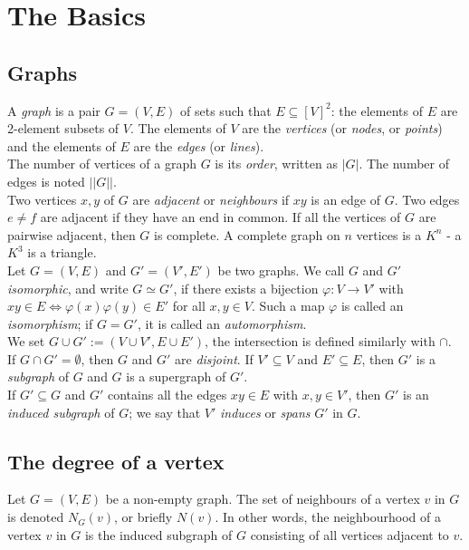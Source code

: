 
\chapter{The Basics}
	\section{Graphs}
		A \textit{graph} is a pair $G = (V, E)$ of sets such that $E \subseteq [V]^2$: the elements of $E$ are 2-element subsets of $V$. The elements of $V$ are the \textit{vertices} (or \textit{nodes}, or \textit{points}) and the elements of $E$ are the \textit{edges} (or \textit{lines}). \\
		
		The number of vertices of a graph $G$ is its \textit{order}, written as $|G|$. The number of edges is noted $||G||$. \\
		
		Two vertices $x, y$ of $G$ are \textit{adjacent} or \textit{neighbours} if $x y$ is an edge of $G$. Two edges $e \neq f$ are adjacent if they have an end in common. If all the vertices of $G$ are pairwise adjacent, then $G$ is complete. A complete graph on $n$ vertices is a $K^n$ - a $K^3$ is a triangle.\\ 
		
		Let $G = (V, E)$ and $G' = (V', E')$ be two graphs. We call $G$ and $G'$ \textit{isomorphic}, and write $G \simeq G'$, if there exists a bijection $\varphi: V \rightarrow V'$ with $xy \in E \iff \varphi(x) \varphi(y) \in E'$ for all $x, y \in V$. Such a map $\varphi$ is called an \textit{isomorphism}; if $G = G'$, it is called an \textit{automorphism}. \\
		
		We set $G \cup G' := (V \cup V', E \cup E')$, the intersection is defined similarly with $\cap$. If $G \cap G' = \emptyset$, then $G$ and $G'$ are \textit{disjoint}. If $V' \subseteq V$ and $E' \subseteq E$, then $G'$ is a \textit{subgraph} of $G$ and $G$ is a supergraph of $G'$.\\
		
		If $G' \subseteq G$ and $G'$ contains all the edges $xy \in E$ with $x, y \in V'$, then $G'$ is an \textit{induced subgraph} of $G$; we say that $V'$ \textit{induces} or \textit{spans} $G'$ in $G$.  
		
	\section{The degree of a vertex}
		Let $G = (V, E)$ be a non-empty graph. The set of neighbours of a vertex $v$ in $G$ is denoted $N_G (v)$, or briefly $N(v)$. In other words, the neighbourhood of a vertex $v$ in $G$ is the induced subgraph of $G$ consisting of all vertices adjacent to $v$. \\
	
